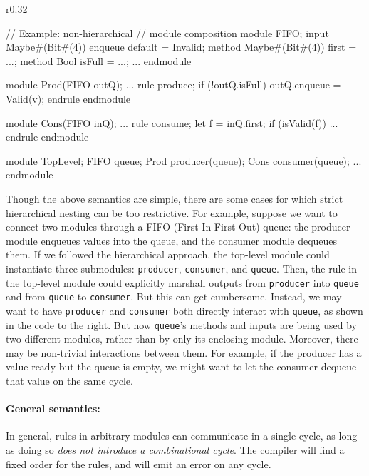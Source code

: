 \begin{wrapfigure}{r}{0.32\columnwidth}
\vspace{-1.5em}
\begin{mscode}
// Example: non-hierarchical
// module composition
module FIFO;
  input Maybe#(Bit#(4))
   enqueue default = Invalid;
  method Maybe#(Bit#(4))
   first = ...;
  method Bool isFull = ...;
  ...
endmodule

module Prod(FIFO outQ);
  ...
  rule produce;
    if (!outQ.isFull)
     outQ.enqueue = Valid(v);
  endrule
endmodule

module Cons(FIFO inQ);
  ...
  rule consume;
    let f = inQ.first;
    if (isValid(f)) ...
  endrule
endmodule

module TopLevel;
  FIFO queue;
  Prod producer(queue);
  Cons consumer(queue);
  ...
endmodule
\end{mscode}
\vspace{-4em}
\end{wrapfigure}

Though the above semantics are simple, there are some cases for which strict hierarchical nesting can be too restrictive.
For example, suppose we want to connect two modules through a FIFO (First-In-First-Out) queue:
the producer module enqueues values into the queue, and the consumer module dequeues them.
If we followed the hierarchical approach, the top-level module could instantiate three submodules:
\texttt{producer}, \texttt{consumer}, and \texttt{queue}.
Then, the rule in the top-level module could explicitly marshall outputs
from \texttt{producer} into \texttt{queue} and from \texttt{queue} to \texttt{consumer}.
But this can get cumbersome.
Instead, we may want to have \texttt{producer} and \texttt{consumer} both directly
interact with \texttt{queue}, as shown in the code to the right.
But now \texttt{queue}'s methods and inputs are being used by two different modules,
rather than by only its enclosing module.
Moreover, there may be non-trivial interactions between them.
For example, if the producer has a value ready but the queue is empty,
we might want to let the consumer dequeue that value on the same cycle.

\paragraph{General semantics:}
In general, rules in arbitrary modules can communicate in a single cycle, as long as
doing so \emph{does not introduce a combinational cycle}.
The compiler will find a fixed order for the rules, and will emit an error on any cycle.

